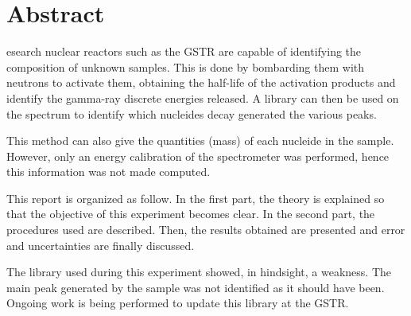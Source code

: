 %
%
%

\chapter*{Abstract}
\begin{SingleSpace}
esearch nuclear reactors such as the GSTR are capable of identifying the composition of unknown samples. This is done by bombarding them with neutrons to activate them, obtaining the half-life of the activation products and identify the gamma-ray discrete energies released. A library can then be used on the spectrum to identify which nucleides decay generated the various peaks.

This method can also give the quantities (mass) of each nucleide in the sample. However, only an energy calibration of the spectrometer was performed, hence this information was not made computed.

This report is organized as follow. In the first part, the theory is explained so that the objective of this experiment becomes clear. In the second part, the procedures used are described. Then, the results obtained are presented and error and uncertainties are finally discussed.

The library used during this experiment showed, in hindsight, a weakness. The main peak generated by the sample was not identified as it should have been. Ongoing work is being performed to update this library at the GSTR.
\end{SingleSpace}
\clearpage
